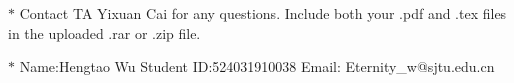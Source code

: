 \documentclass[12pt,a4paper]{article}
\theoremstyle{definition}
\begin{document}
\noindent

\noindent{}
\begin{center}
\footnotesize{\color{red}$*$ Contact TA Yixuan Cai for any questions. Include both your .pdf and .tex files in the uploaded .rar or .zip file.}

\footnotesize{\color{blue}$*$ Name:Hengtao Wu  \quad Student ID:524031910038 \quad Email: Eternity\_w@sjtu.edu.cn}
\end{center}
\end{document}
